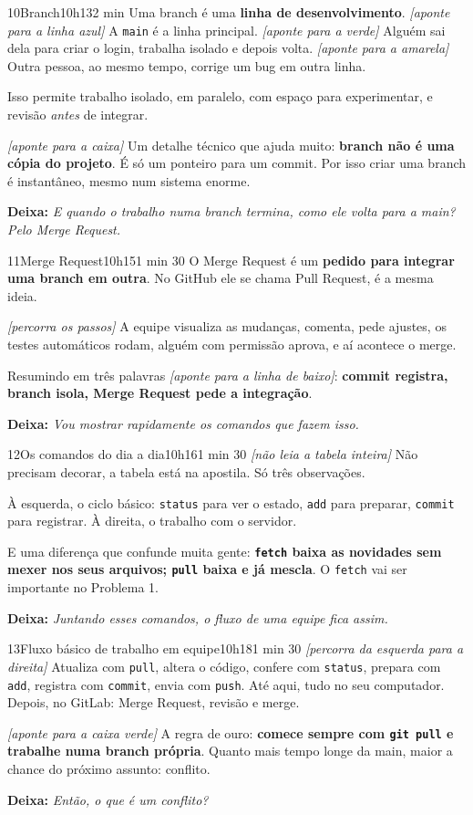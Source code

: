 \documentclass[11pt,a4paper]{article}
\newcommand{\acao}[1]{{\color{ouroMB!75!black}\small\itshape [#1]}}
\newcommand{\deixa}[1]{\par{\color{verdeMB}\small\bfseries \faLongArrowAltRight\; Deixa:} {\small\itshape #1}}
\newcommand{\cmd}[1]{\texttt{\color{azulMB}#1}}
\begin{document}
\begin{slide}{10}{Branch}{10h13}{2 min}
Uma branch é uma \textbf{linha de desenvolvimento}. \acao{aponte para a linha azul} A \texttt{main} é a linha principal. \acao{aponte para a verde} Alguém sai dela para criar o login, trabalha isolado e depois volta. \acao{aponte para a amarela} Outra pessoa, ao mesmo tempo, corrige um bug em outra linha.

Isso permite trabalho isolado, em paralelo, com espaço para experimentar, e revisão \emph{antes} de integrar.

\acao{aponte para a caixa} Um detalhe técnico que ajuda muito: \textbf{branch não é uma cópia do projeto}. É só um ponteiro para um commit. Por isso criar uma branch é instantâneo, mesmo num sistema enorme.
\deixa{E quando o trabalho numa branch termina, como ele volta para a main? Pelo Merge Request.}
\end{slide}

\begin{slide}{11}{Merge Request}{10h15}{1 min 30}
O Merge Request é um \textbf{pedido para integrar uma branch em outra}. No GitHub ele se chama Pull Request, é a mesma ideia.

\acao{percorra os passos} A equipe visualiza as mudanças, comenta, pede ajustes, os testes automáticos rodam, alguém com permissão aprova, e aí acontece o merge.

Resumindo em três palavras \acao{aponte para a linha de baixo}: \textbf{commit registra, branch isola, Merge Request pede a integração}.
\deixa{Vou mostrar rapidamente os comandos que fazem isso.}
\end{slide}

\begin{slide}{12}{Os comandos do dia a dia}{10h16}{1 min 30}
\acao{não leia a tabela inteira} Não precisam decorar, a tabela está na apostila. Só três observações.

À esquerda, o ciclo básico: \cmd{status} para ver o estado, \cmd{add} para preparar, \cmd{commit} para registrar. À direita, o trabalho com o servidor.

E uma diferença que confunde muita gente: \textbf{\cmd{fetch} baixa as novidades sem mexer nos seus arquivos; \cmd{pull} baixa e já mescla}. O \cmd{fetch} vai ser importante no Problema 1.
\deixa{Juntando esses comandos, o fluxo de uma equipe fica assim.}
\end{slide}

\begin{slide}{13}{Fluxo básico de trabalho em equipe}{10h18}{1 min 30}
\acao{percorra da esquerda para a direita}
Atualiza com \cmd{pull}, altera o código, confere com \cmd{status}, prepara com \cmd{add}, registra com \cmd{commit}, envia com \cmd{push}. Até aqui, tudo no seu computador. Depois, no GitLab: Merge Request, revisão e merge.

\acao{aponte para a caixa verde} A regra de ouro: \textbf{comece sempre com \cmd{git pull} e trabalhe numa branch própria}. Quanto mais tempo longe da main, maior a chance do próximo assunto: conflito.
\deixa{Então, o que é um conflito?}
\end{slide}
\end{document}
